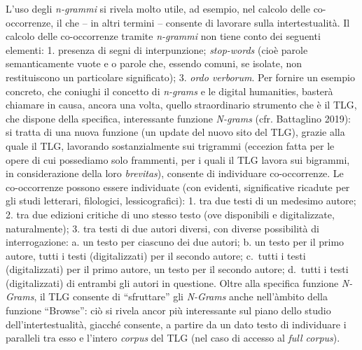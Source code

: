 \documentclass[
  b5paper,
  twoside,
  12pt,
  chapterprefix=false,
  bibliography=totocnumbered,
  parskip=false]{scrbook}
\begin{document}
L'uso degli \emph{n-grammi} si rivela molto utile, ad esempio, nel calcolo
delle co-occorrenze, il che -- in altri termini -- consente di lavorare
sulla intertestualità. Il calcolo delle co-occorrenze tramite \emph{n-grammi}
non tiene conto dei seguenti elementi: 1. presenza di segni di
interpunzione; \emph{stop-words} (cioè parole semanticamente vuote e o parole
che, essendo comuni, se isolate, non restituiscono un particolare
significato); 3. \emph{ordo verborum}. Per fornire un esempio concreto, che
coniughi il concetto di \emph{n-grams} e le digital humanities, basterà
chiamare in causa, ancora una volta, quello straordinario strumento che
è il TLG, che dispone della specifica, interessante funzione \emph{N-grams}
(cfr. Battaglino 2019): si tratta di una nuova funzione (un update del
nuovo sito del TLG), grazie alla quale il TLG, lavorando
sostanzialmente sui trigrammi (eccezion fatta per le opere di cui
possediamo solo frammenti, per i quali il TLG lavora sui bigrammi, in
considerazione della loro \emph{brevitas}), consente di individuare
co-occorrenze. Le co-occorrenze possono essere individuate (con
evidenti, significative ricadute per gli studi letterari, filologici,
lessicografici): 1. tra due testi di un medesimo autore; 2. tra due
edizioni critiche di uno stesso testo (ove disponibili e digitalizzate,
naturalmente); 3. tra testi di due autori diversi, con diverse
possibilità di interrogazione: a. un testo per ciascuno dei due autori;
b. un testo per il primo autore, tutti i testi (digitalizzati) per il
secondo autore; c.~tutti i testi (digitalizzati) per il primo autore, un
testo per il secondo autore; d.~tutti i testi (digitalizzati) di
entrambi gli autori in questione. Oltre alla specifica funzione
\emph{N-Grams}, il TLG consente di \enquote{sfruttare} gli \emph{N-Grams} anche
nell'àmbito della funzione \enquote{Browse}: ciò si rivela ancor più
interessante sul piano dello studio dell'intertestualità, giacché
consente, a partire da un dato testo di individuare i paralleli tra esso
e l'intero \emph{corpus} del TLG (nel caso di accesso al \emph{full corpus}).
\end{document}
